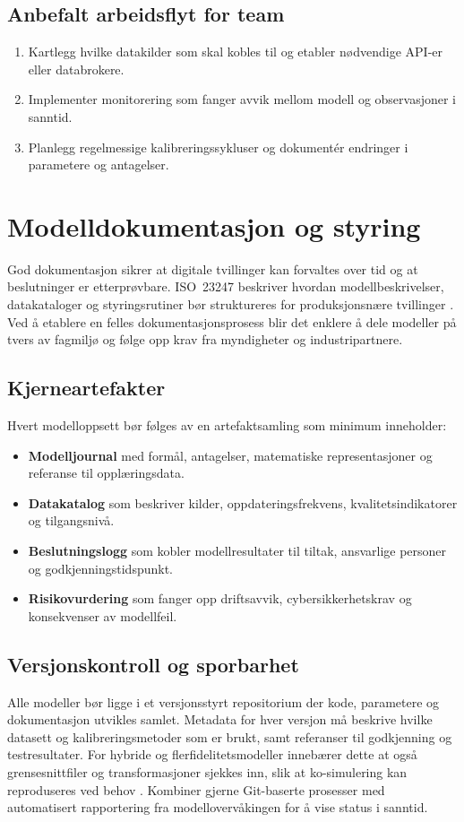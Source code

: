 \subsection{Anbefalt arbeidsflyt for team}
\begin{enumerate}
    \item Kartlegg hvilke datakilder som skal kobles til og etabler nødvendige API-er eller databrokere.
    \item Implementer monitorering som fanger avvik mellom modell og observasjoner i sanntid.
    \item Planlegg regelmessige kalibreringssykluser og dokumentér endringer i parametere og antagelser.
\end{enumerate}

\section{Modelldokumentasjon og styring}
God dokumentasjon sikrer at digitale tvillinger kan forvaltes over tid og at beslutninger er etterprøvbare. ISO~23247 beskriver hvordan modellbeskrivelser, datakataloger og styringsrutiner bør struktureres for produksjonsnære tvillinger \citep{iso23247-2021}. Ved å etablere en felles dokumentasjonsprosess blir det enklere å dele modeller på tvers av fagmiljø og følge opp krav fra myndigheter og industripartnere.

\subsection{Kjerneartefakter}
Hvert modelloppsett bør følges av en artefaktsamling som minimum inneholder:
\begin{itemize}
    \item \textbf{Modelljournal} med formål, antagelser, matematiske representasjoner og referanse til opplæringsdata.
    \item \textbf{Datakatalog} som beskriver kilder, oppdateringsfrekvens, kvalitetsindikatorer og tilgangsnivå.
    \item \textbf{Beslutningslogg} som kobler modellresultater til tiltak, ansvarlige personer og godkjenningstidspunkt.
    \item \textbf{Risikovurdering} som fanger opp driftsavvik, cybersikkerhetskrav og konsekvenser av modellfeil.
\end{itemize}

\subsection{Versjonskontroll og sporbarhet}
Alle modeller bør ligge i et versjonsstyrt repositorium der kode, parametere og dokumentasjon utvikles samlet. Metadata for hver versjon må beskrive hvilke datasett og kalibreringsmetoder som er brukt, samt referanser til godkjenning og testresultater. For hybride og flerfidelitetsmodeller innebærer dette at også grensesnittfiler og transformasjoner sjekkes inn, slik at ko-simulering kan reproduseres ved behov \citep{boschert2018digital}. Kombiner gjerne Git-baserte prosesser med automatisert rapportering fra modellovervåkingen for å vise status i sanntid.

